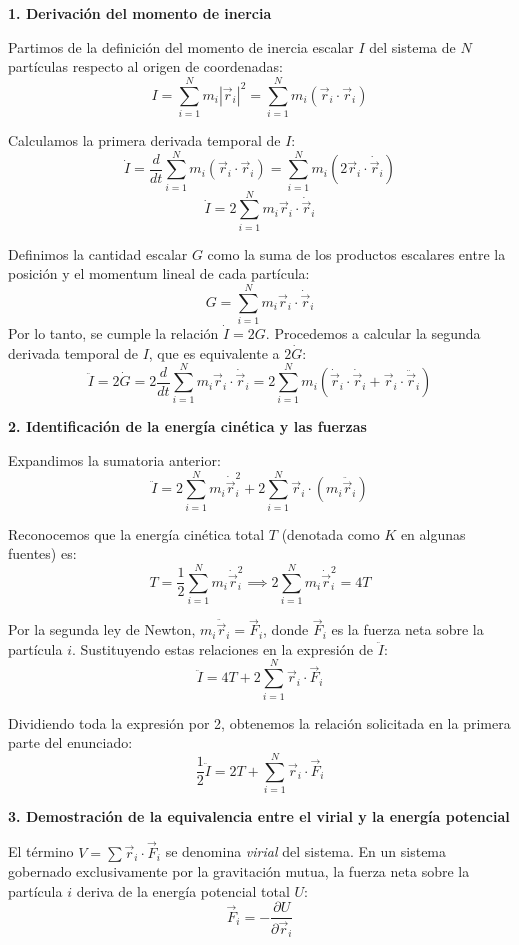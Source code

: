 \documentclass[12pt, letterpaper]{article}
\begin{document}
\textbf{1. Derivación del momento de inercia}

Partimos de la definición del momento de inercia escalar $I$ del sistema de $N$ partículas respecto al origen de coordenadas:
$$ I = \sum_{i=1}^N m_i |\vec{r}_i|^2 = \sum_{i=1}^N m_i (\vec{r}_i \cdot \vec{r}_i) $$

Calculamos la primera derivada temporal de $I$:
$$ \dot{I} = \frac{d}{dt} \sum_{i=1}^N m_i (\vec{r}_i \cdot \vec{r}_i) = \sum_{i=1}^N m_i (2 \vec{r}_i \cdot \dot{\vec{r}}_i) $$
$$ \dot{I} = 2 \sum_{i=1}^N m_i \vec{r}_i \cdot \dot{\vec{r}}_i $$

Definimos la cantidad escalar $G$ como la suma de los productos escalares entre la posición y el momentum lineal de cada partícula:
$$ G = \sum_{i=1}^N m_i \vec{r}_i \cdot \dot{\vec{r}}_i $$
Por lo tanto, se cumple la relación $\dot{I} = 2G$. Procedemos a calcular la segunda derivada temporal de $I$, que es equivalente a $2\dot{G}$:
$$ \ddot{I} = 2 \dot{G} = 2 \frac{d}{dt} \sum_{i=1}^N m_i \vec{r}_i \cdot \dot{\vec{r}}_i = 2 \sum_{i=1}^N m_i (\dot{\vec{r}}_i \cdot \dot{\vec{r}}_i + \vec{r}_i \cdot \ddot{\vec{r}}_i) $$

\textbf{2. Identificación de la energía cinética y las fuerzas}

Expandimos la sumatoria anterior:
$$ \ddot{I} = 2 \sum_{i=1}^N m_i \dot{\vec{r}}_i^2 + 2 \sum_{i=1}^N \vec{r}_i \cdot (m_i \ddot{\vec{r}}_i) $$

Reconocemos que la energía cinética total $T$ (denotada como $K$ en algunas fuentes) es:
$$ T = \frac{1}{2} \sum_{i=1}^N m_i \dot{\vec{r}}_i^2 \implies 2 \sum_{i=1}^N m_i \dot{\vec{r}}_i^2 = 4T $$

Por la segunda ley de Newton, $m_i \ddot{\vec{r}}_i = \vec{F}_i$, donde $\vec{F}_i$ es la fuerza neta sobre la partícula $i$. Sustituyendo estas relaciones en la expresión de $\ddot{I}$:
$$ \ddot{I} = 4T + 2 \sum_{i=1}^N \vec{r}_i \cdot \vec{F}_i $$

Dividiendo toda la expresión por 2, obtenemos la relación solicitada en la primera parte del enunciado:
$$ \frac{1}{2} \ddot{I} = 2T + \sum_{i=1}^N \vec{r}_i \cdot \vec{F}_i $$

\textbf{3. Demostración de la equivalencia entre el virial y la energía potencial}

El término $V = \sum \vec{r}_i \cdot \vec{F}_i$ se denomina \textit{virial} del sistema. En un sistema gobernado exclusivamente por la gravitación mutua, la fuerza neta sobre la partícula $i$ deriva de la energía potencial total $U$:
$$ \vec{F}_i = -\frac{\partial U}{\partial \vec{r}_i} $$
\end{document}
